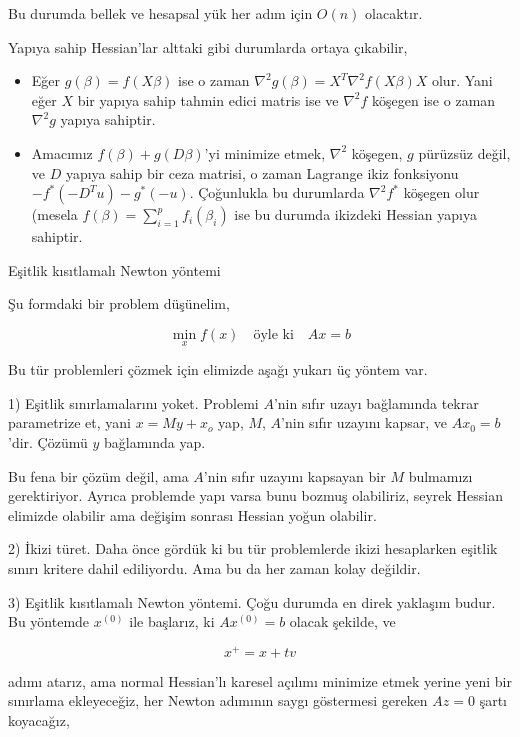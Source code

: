 \documentclass[12pt,fleqn]{article}\usepackage{../../common}
\begin{document}
Bu durumda bellek ve hesapsal yük her adım için $O(n)$ olacaktır. 

Yapıya sahip Hessian'lar alttaki gibi durumlarda ortaya çıkabilir, 

\begin{itemize}

\item Eğer $g(\beta) = f(X\beta)$ ise o zaman
  $\nabla^2 g(\beta) = X^T \nabla ^2 f(X\beta) X$ olur. Yani eğer $X$ bir
  yapıya sahip tahmin edici matris ise ve $\nabla^2 f$ köşegen ise o zaman
  $\nabla^2 g$ yapıya sahiptir.

\item Amacımız $f(\beta) + g(D\beta)$'yi minimize etmek, $\nabla^2$
  köşegen, $g$ pürüzsüz değil, ve $D$ yapıya sahip bir ceza matrisi, o
  zaman Lagrange ikiz fonksiyonu $-f^\ast(-D^Tu)-g^\ast(-u)$. Çoğunlukla bu
  durumlarda $\nabla^2f^\ast$ köşegen olur (mesela
  $f(\beta) = \sum_{i=1}^{p}f_i (\beta_i)$ ise bu durumda ikizdeki Hessian
  yapıya sahiptir.

\end{itemize}

Eşitlik kısıtlamalı Newton yöntemi

Şu formdaki bir problem düşünelim, 

$$
\min_x f(x) \quad \textrm{öyle ki} \quad Ax = b
$$
  
Bu tür problemleri çözmek için elimizde aşağı yukarı üç yöntem var. 

1) Eşitlik sınırlamalarını yoket. Problemi $A$'nin sıfır uzayı bağlamında
tekrar parametrize et, yani $x = My + x_o$ yap, $M$, $A$'nin sıfır uzayını
kapsar, ve $A x_0 = b$'dir. Çözümü $y$ bağlamında yap.

Bu fena bir çözüm değil, ama $A$'nin sıfır uzayını kapsayan bir $M$
bulmamızı gerektiriyor. Ayrıca problemde yapı varsa bunu bozmuş olabiliriz,
seyrek Hessian elimizde olabilir ama değişim sonrası Hessian yoğun
olabilir. 

2) İkizi türet. Daha önce gördük ki bu tür problemlerde ikizi hesaplarken
eşitlik sınırı kritere dahil ediliyordu. Ama bu da her zaman kolay
değildir. 

3) Eşitlik kısıtlamalı Newton yöntemi. Çoğu durumda en direk yaklaşım
budur. Bu yöntemde $x^{(0)}$ ile başlarız, ki $Ax^{(0)}=b$ olacak şekilde,
ve

$$
x^+ = x + tv
$$

adımı atarız, ama normal Hessian'lı karesel açılımı minimize etmek yerine
yeni bir sınırlama ekleyeceğiz, her Newton adımının saygı göstermesi
gereken $Az=0$ şartı koyacağız,  
\end{document}
